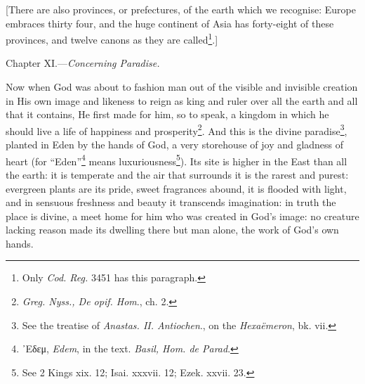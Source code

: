 [There are also provinces, or prefectures, of the earth which we recognise: Europe embraces thirty four, and the huge continent of Asia has forty-eight of these provinces, and twelve canons as they are called\footnote{Only \emph{Cod. Reg. }3451 has this paragraph.}.]


Chapter XI.—\emph{Concerning Paradise.}

Now when God was about to fashion man out of the visible and invisible creation in His own image and likeness to reign as king and ruler over all the earth and all that it contains, He first made for him, so to speak, a kingdom in which he should live a life of happiness and prosperity\footnote{\emph{Greg. Nyss., De opif. Hom}., ch. 2.}. And this is the divine paradise\footnote{See the treatise of \emph{Anastas. II. Antiochen}., on the \emph{Hexaëmeron}, bk. vii.}, planted in Eden by the hands of God, a very storehouse of joy and gladness of heart (for “Eden”\footnote{\textgreek{᾽Εδεμ}, \emph{Edem}, in the text. \emph{Basil, Hom. de Parad}.} means luxuriousness\footnote{See 2 Kings xix. 12; Isai. xxxvii. 12; Ezek. xxvii. 23.}). Its site is higher in the East than all the earth: it is temperate and the air that surrounds it is the rarest and purest: evergreen plants are its pride, sweet fragrances abound, it is flooded with light, and in sensuous freshness and beauty it transcends imagination: in truth the place is divine, a meet home for him who was created in God’s image: no creature lacking reason made its dwelling there but man alone, the work of God’s own hands.

